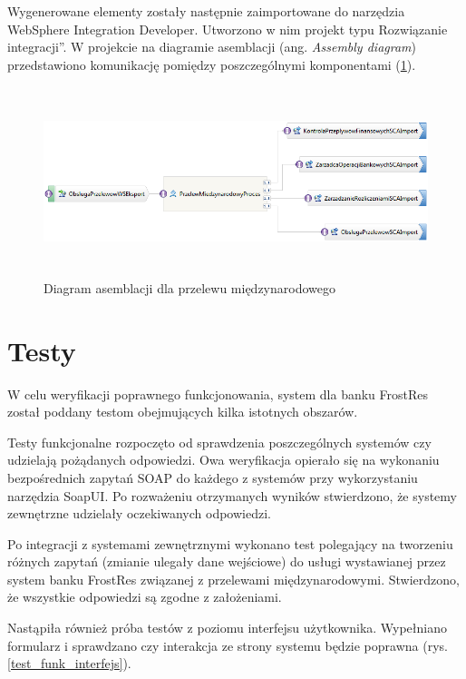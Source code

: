 Wygenerowane elementy zostały następnie zaimportowane do narzędzia WebSphere Integration Developer. Utworzono w nim projekt typu \quotedblbase Rozwiązanie integracji\textquotedblright. W projekcie na diagramie asemblacji (ang. \emph{Assembly diagram}) przedstawiono komunikację pomiędzy poszczególnymi komponentami (\ref{komponenty_inbound_outbound}).  

\begin{figure}[h!tbp]
\begin{centering}
\includegraphics[width=15cm, height=5.5cm]{img/komponenty_inbound_outbound.png}
\caption[Diagram asemblacji dla przelewu międzynarodowego]{Diagram asemblacji dla przelewu międzynarodowego}\label{komponenty_inbound_outbound}
\end{centering}
\end{figure}


\section{Testy}
W celu weryfikacji poprawnego funkcjonowania, system dla banku FrostRes został poddany testom obejmujących kilka istotnych obszarów.

Testy funkcjonalne rozpoczęto od sprawdzenia poszczególnych systemów czy udzielają pożądanych odpowiedzi. Owa weryfikacja opierało się na wykonaniu bezpośrednich zapytań SOAP do każdego z systemów przy wykorzystaniu narzędzia SoapUI. Po rozważeniu otrzymanych wyników stwierdzono, że systemy zewnętrzne udzielały oczekiwanych odpowiedzi.

Po integracji z systemami zewnętrznymi wykonano test polegający na tworzeniu różnych zapytań (zmianie ulegały dane wejściowe) do usługi wystawianej przez system banku FrostRes związanej z przelewami międzynarodowymi. Stwierdzono, że wszystkie odpowiedzi są zgodne z założeniami.

Nastąpiła również próba testów z poziomu interfejsu użytkownika. Wypełniano formularz i sprawdzano czy interakcja ze strony systemu będzie poprawna (rys. \ref{test_funk_interfejs}). 


